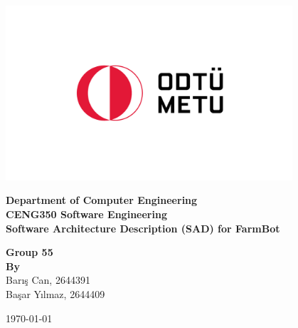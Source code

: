 \begin{titlepage}
   \begin{center}

       \includegraphics[width=0.8\textwidth]{Figures/metu_logo.png}
       \vspace{0.0cm}
     
            
        \textbf{\LARGE Department of  Computer Engineering} \\
        \vspace{0.5cm}
        \textbf{\LARGE CENG350 Software Engineering}\\
        \vspace{0.5cm} 
        \textbf{\LARGE Software Architecture Description (SAD) for FarmBot} \\
        \vspace{1.5cm} 
 

        \textbf{Group 55}\\
       \textbf{\textbf{By}} \\Barış Can, 2644391 \\ Başar Yılmaz, 2644409 \\
       

       \vspace{1.5cm}
            
    
\vspace{0.5cm}
            


\today            
   \end{center}
\end{titlepage}
